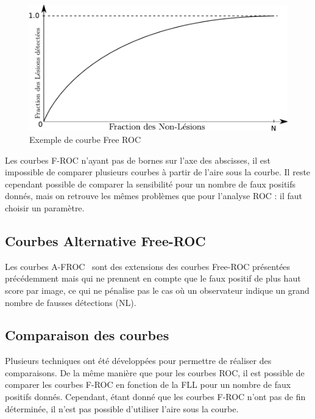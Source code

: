 
\begin{figure}[h]
	\begin{center}
	\includegraphics[width=15cm]{images/FROC}
	\end{center}
	\caption{Exemple de courbe Free ROC}
	\label{fig:courbeFROC}
\end{figure}

Les courbes F-ROC n'ayant pas de bornes sur l’axe des abscisses, il est impossible de comparer plusieurs courbes à partir de l'aire sous la courbe. Il reste cependant possible de comparer la sensibilité pour un nombre de faux positifs donnés, mais on retrouve les mêmes problèmes que pour l'analyse ROC : il faut choisir un paramètre.

\subsection{Courbes Alternative Free-ROC}

Les courbes A-FROC~\cite{chakraborty1990free} sont des extensions des courbes Free-ROC présentées précédemment mais qui ne prennent en compte que le faux positif de plus haut score par image, ce qui ne pénalise pas le cas où un observateur indique un grand nombre de fausses détections (NL).

\subsection{Comparaison des courbes}
\label{lab:AFROC}
Plusieurs techniques ont été développées pour permettre de réaliser des comparaisons. De la même manière que pour les courbes ROC, il est possible de comparer les courbes F-ROC en fonction de la FLL pour un nombre de faux positifs donnés. Cependant, étant donné que les courbes F-ROC n'ont pas de fin déterminée, il n'est pas possible d'utiliser l'aire sous la courbe. 

